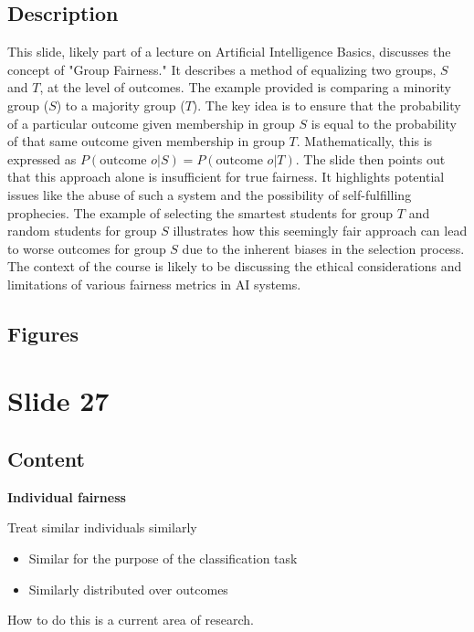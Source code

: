\documentclass{article}%
\begin{document}
\subsection{Description}%
This slide, likely part of a lecture on Artificial Intelligence Basics, discusses the concept of "Group Fairness."  It describes a method of equalizing two groups, $S$ and $T$, at the level of outcomes.  The example provided is comparing a minority group ($S$) to a majority group ($T$).  The key idea is to ensure that the probability of a particular outcome given membership in group $S$ is equal to the probability of that same outcome given membership in group $T$.  Mathematically, this is expressed as $P(\text{outcome } o | S) = P(\text{outcome } o | T)$.  The slide then points out that this approach alone is insufficient for true fairness.  It highlights potential issues like the abuse of such a system and the possibility of self-fulfilling prophecies.  The example of selecting the smartest students for group $T$ and random students for group $S$ illustrates how this seemingly fair approach can lead to worse outcomes for group $S$ due to the inherent biases in the selection process.  The context of the course is likely to be discussing the ethical considerations and limitations of various fairness metrics in AI systems.%
\subsection{Figures}%
\begin{figure}[H]%
\centering%
\end{figure}

%
\newpage%
\section{Slide 27}%
\label{sec:Slide27}%
\subsection{Content}%

\textbf{Individual fairness}

Treat similar individuals similarly

\begin{itemize}
    \item Similar for the purpose of the classification task
    \item Similarly distributed over outcomes
\end{itemize}

How to do this is a current area of research.
%
\end{document}
